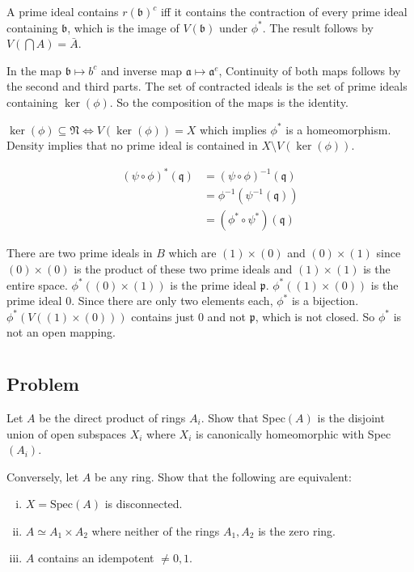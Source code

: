 \documentclass[book,12pt,oneside,openany]{memoir}
\begin{document}
A prime ideal contains $r(\mathfrak b)^c$ iff it contains
the contraction of every prime ideal containing $\mathfrak b$,
which is the image of $V(\mathfrak b)$ under $\phi^*$.
The result follows by $V(\bigcap A)=\bar{A}$.

In the map $\mathfrak b\mapsto b^c$ and
inverse map $\mathfrak a \mapsto \mathfrak a^e$,
Continuity of both maps follows by the second and third parts.
The set of contracted ideals is the set of prime ideals
containing $\ker(\phi)$.
So the composition of the maps is the identity.

$\ker(\phi)\subseteq\mathfrak N\iff V(\ker(\phi))=X$ which implies
$\phi^*$ is a homeomorphism.
Density implies that no prime ideal is contained in
$X\setminus V(\ker(\phi))$.

\begin{align*}
  (\psi\circ\phi)^*(\mathfrak q)&=(\psi\circ\phi)^{-1}(\mathfrak q)\\
  &=\phi^{-1}(\psi^{-1}(\mathfrak q))\\
  &=(\phi^*\circ\psi^*)(\mathfrak q)
\end{align*}

There are two prime ideals in $B$ which are $(1)\times(0)$ and
$(0)\times(1)$ since $(0)\times(0)$ is the product of these two prime
ideals and $(1)\times(1)$ is the entire space.
$\phi^*((0)\times(1))$ is the prime ideal $\mathfrak p$.
$\phi^*((1)\times(0))$ is the prime ideal $0$.
Since there are only two elements each, $\phi^*$ is a bijection.
$\phi^*(V((1)\times(0)))$ contains just $0$ and not $\mathfrak p$, which
is not closed.
So $\phi^*$ is not an open mapping.
\section{}
\subsection{Problem}
Let $A$ be the direct product of rings $A_i$.
Show that Spec$(A)$ is the disjoint union of open subspaces $X_i$
where $X_i$ is canonically homeomorphic with Spec$(A_i)$.

Conversely, let $A$ be any ring.
Show that the following are equivalent:
\begin{enumerate}[i)]
\item $X=\text{Spec}(A)$ is disconnected.
\item $A\simeq A_1\times A_2$ where neither of the rings $A_1,A_2$
is the zero ring.
\item $A$ contains an idempotent $\ne 0,1$.
\end{enumerate}
\end{document}
